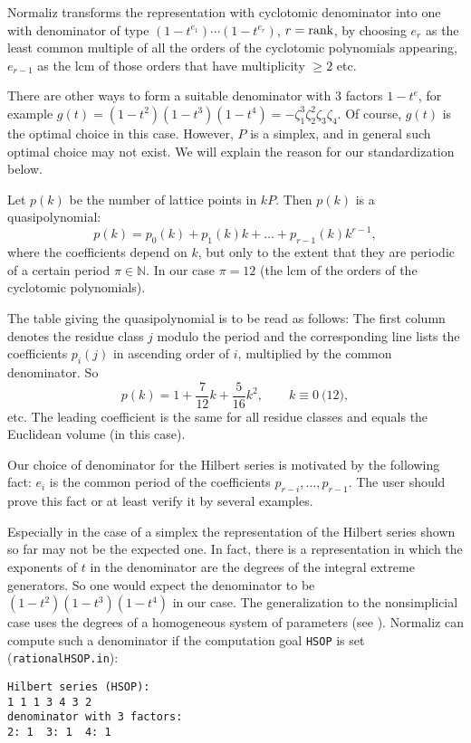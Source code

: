 \documentclass[12pt,a4paper]{scrartcl}
\theoremstyle{definition}
\def\NN{{\mathbb N}}
\begin{document}
Normaliz transforms the representation with cyclotomic
denominator into one with denominator of type
$(1-t^{e_1})\cdots(1-t^{e_r})$, $r=\textup{rank}$, by choosing
$e_r$ as the least common multiple of all the orders of the
cyclotomic polynomials appearing, $e_{r-1}$ as the lcm of those
orders that have multiplicity $\ge 2$ etc.

There are other ways to form a suitable denominator with $3$
factors $1-t^e$, for example
$g(t)=(1-t^2)(1-t^3)(1-t^4)=-\zeta_1^3\zeta_2^2\zeta_3\zeta_4$.
Of course, $g(t)$ is the optimal choice in this case. However,
$P$ is a simplex, and in general such optimal choice may not
exist. We will explain the reason for our standardization
below.

Let $p(k)$ be the number of lattice points in $kP$. Then $p(k)$
is a quasipolynomial:
$$
p(k)=p_0(k)+p_1(k)k+\dots+p_{r-1}(k)k^{r-1},
$$
where the coefficients depend on $k$, but only to the extent
that they are periodic of a certain period $\pi\in\NN$. In our
case $\pi=12$ (the lcm of the orders of the cyclotomic
polynomials).

The table giving the quasipolynomial is to be read as follows:
The first column denotes the residue class $j$ modulo the
period and the corresponding line lists the coefficients
$p_i(j)$ in ascending order of $i$, multiplied by the common
denominator. So
$$
p(k)=1+\frac{7}{12}k+\frac{5}{16}k^2, \qquad k\equiv 0\pod{12},
$$
etc. The leading coefficient is the same for all residue
classes and equals the Euclidean volume (in this case).

Our choice of denominator for the Hilbert series is motivated
by the following fact: $e_i$ is the common period of the
coefficients $p_{r-i},\dots,p_{r-1}$. The user should prove
this fact or at least verify it by several examples.

Especially in the case of a simplex the representation of the Hilbert series shown so far may not be the expected one. In fact, there is a representation in which the exponents of $t$ in the denominator are the degrees of the integral extreme generators. So one would expect the denominator to be $(1-t^2)(1-t^3)(1-t^4)$ in our case. The generalization to the nonsimplicial case uses the degrees of a homogeneous system of parameters (see \cite[p. 200]{BG}). Normaliz can compute such a denominator if the computation goal \verb|HSOP| is set (\verb|rationalHSOP.in|):
\begin{Verbatim}
Hilbert series (HSOP):
1 1 1 3 4 3 2 
denominator with 3 factors:
2: 1  3: 1  4: 1 
\end{Verbatim}
\end{document}
